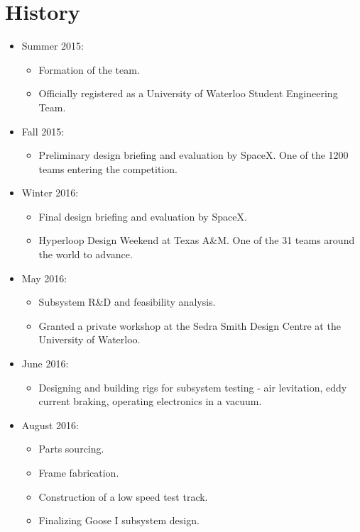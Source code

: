 \documentclass[main.tex]{subfiles}
\begin{document}
\section{History}
\begin{itemize}

\item Summer 2015:
\begin{itemize}
    \item Formation of the team.
    \item Officially registered as a University of Waterloo Student Engineering Team.
\end{itemize}

\item Fall 2015:
\begin{itemize}
    \item Preliminary design briefing and evaluation by SpaceX. One of the 1200 teams entering the competition.
\end{itemize}

\item Winter 2016:
\begin{itemize}
    \item Final design briefing and evaluation by SpaceX.
    \item Hyperloop Design Weekend at Texas A\&M. One of the 31 teams around the world to advance.
\end{itemize}

\item May 2016:
\begin{itemize}
    \item Subsystem R\&D and feasibility analysis.
    \item Granted a private workshop at the Sedra Smith Design Centre at the University of Waterloo.
\end{itemize}

\item June 2016:
\begin{itemize}
    \item Designing and building rigs for subsystem testing - air levitation, eddy current braking, operating electronics in a vacuum.
\end{itemize}

\item August 2016:
\begin{itemize}
    \item Parts sourcing.
    \item Frame fabrication.
    \item Construction of a low speed test track.
    \item Finalizing Goose I subsystem design.
\end{itemize}


\end{itemize}
\end{document}
